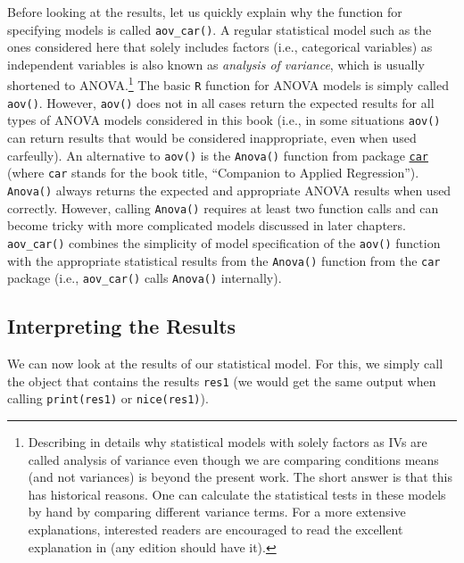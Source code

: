 \documentclass[
]{book}
\begin{document}
Before looking at the results, let us quickly explain why the function for specifying models is called \texttt{aov\_car()}. A regular statistical model such as the ones considered here that solely includes factors (i.e., categorical variables) as independent variables is also known as \emph{analysis of variance}, which is usually shortened to ANOVA.\footnote{Describing in details why statistical models with solely factors as IVs are called analysis of variance even though we are comparing conditions means (and not variances) is beyond the present work. The short answer is that this has historical reasons. One can calculate the statistical tests in these models by hand by comparing different variance terms. For a more extensive explanations, interested readers are encouraged to read the excellent explanation in \citet{howellStatisticalMethodsPsychology2013} (any edition should have it).} The basic \texttt{R} function for ANOVA models is simply called \texttt{aov()}. However, \texttt{aov()} does not in all cases return the expected results for all types of ANOVA models considered in this book (i.e., in some situations \texttt{aov()} can return results that would be considered inappropriate, even when used carfeully). An alternative to \texttt{aov()} is the \texttt{Anova()} function from package \href{https://cran.r-project.org/package=car}{\texttt{car}} \citep{foxCompanionAppliedRegression2019} (where \texttt{car} stands for the book title, ``Companion to Applied Regression''). \texttt{Anova()} always returns the expected and appropriate ANOVA results when used correctly. However, calling \texttt{Anova()} requires at least two function calls and can become tricky with more complicated models discussed in later chapters. \texttt{aov\_car()} combines the simplicity of model specification of the \texttt{aov()} function with the appropriate statistical results from the \texttt{Anova()} function from the \texttt{car} package (i.e., \texttt{aov\_car()} calls \texttt{Anova()} internally).

\hypertarget{interpreting-the-results}{%
\subsection{Interpreting the Results}\label{interpreting-the-results}}

We can now look at the results of our statistical model. For this, we simply call the object that contains the results \texttt{res1} (we would get the same output when calling \texttt{print(res1)} or \texttt{nice(res1)}).
\end{document}
